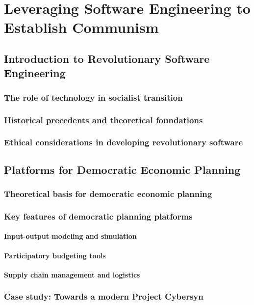 \chapter{Leveraging Software Engineering to Establish Communism}

\section{Introduction to Revolutionary Software Engineering}
\subsection{The role of technology in socialist transition}
\subsection{Historical precedents and theoretical foundations}
\subsection{Ethical considerations in developing revolutionary software}

\newpage

\section{Platforms for Democratic Economic Planning}
\subsection{Theoretical basis for democratic economic planning}
\subsection{Key features of democratic planning platforms}
\subsubsection{Input-output modeling and simulation}
\subsubsection{Participatory budgeting tools}
\subsubsection{Supply chain management and logistics}
\subsection{Case study: Towards a modern Project Cybersyn}
